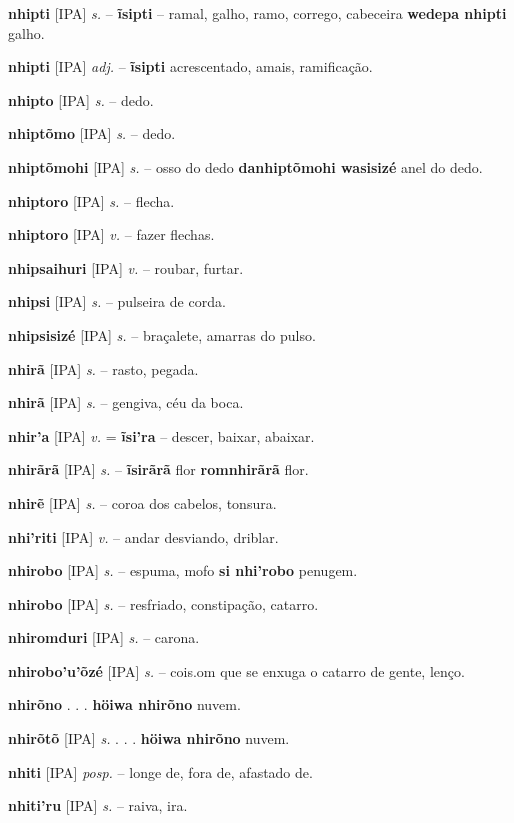 \textbf{nhipti} [IPA] \textit{s.} -- \textbf{ĩsipti} -- ramal, galho, ramo, corrego, cabeceira  \textbf{wedepa nhipti} galho.

\textbf{nhipti} [IPA] \textit{adj.} -- \textbf{ĩsipti} acrescentado, amais, ramificação.

\textbf{nhipto} [IPA] \textit{s.} -- dedo.

\textbf{nhiptõmo} [IPA] \textit{s.} -- dedo.

\textbf{nhiptõmohi} [IPA] \textit{s.} -- osso do dedo  \textbf{danhiptõmohi wasisizé} anel do dedo.

\textbf{nhiptoro} [IPA] \textit{s.} -- flecha.

\textbf{nhiptoro} [IPA] \textit{v.} -- fazer flechas.

\textbf{nhipsaihuri} [IPA] \textit{v.} -- roubar, furtar.

\textbf{nhipsi} [IPA] \textit{s.} -- pulseira de corda.

\textbf{nhipsisizé} [IPA] \textit{s.} -- braçalete, amarras do pulso.

\textbf{nhirã} [IPA] \textit{s.} -- rasto, pegada.

\textbf{nhirã} [IPA] \textit{s.} -- gengiva, céu da boca.

\textbf{nhir'a} [IPA] \textit{v.} = \textbf{ĩsi'ra} -- descer, baixar, abaixar.

\textbf{nhirãrã} [IPA] \textit{s.} -- \textbf{ĩsirãrã} flor  \textbf{romnhirãrã} flor.

\textbf{nhirẽ} [IPA] \textit{s.} -- coroa dos cabelos, tonsura.

\textbf{nhi'riti} [IPA] \textit{v.} -- andar desviando, driblar.

\textbf{nhirobo} [IPA] \textit{s.} -- espuma, mofo  \textbf{si nhi'robo} penugem.

\textbf{nhirobo} [IPA] \textit{s.} -- resfriado, constipação, catarro.

\textbf{nhiromduri} [IPA] \textit{s.} -- carona.

\textbf{nhirobo'u'õzé} [IPA] \textit{s.} -- cois.om que se enxuga o catarro de gente, lenço.

\textbf{nhirõno} . . .  \textbf{höiwa nhirõno} nuvem.

\textbf{nhirõtõ} [IPA] \textit{s.} . . .  \textbf{höiwa nhirõno} nuvem.

\textbf{nhiti} [IPA] \textit{posp.} -- longe de, fora de, afastado de.

\textbf{nhiti'ru} [IPA] \textit{s.} -- raiva, ira.

